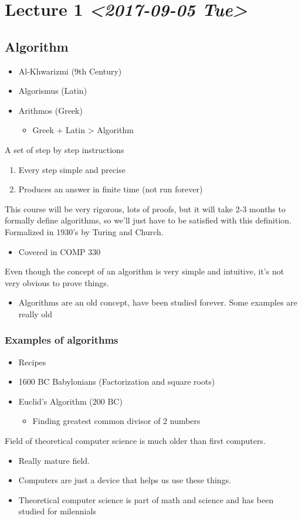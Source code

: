 \documentclass[11pt]{article}
\date{\today}
\title{}
\begin{document}
\tableofcontents

\section{Lecture 1 \textit{<2017-09-05 Tue>}}
\label{sec:org0096472}
\subsection{Algorithm}
\label{sec:orgdd4a82c}
\begin{itemize}
\item Al-Khwarizmi (9th Century)
\item Algorismus (Latin)
\item Arithmos (Greek)
\begin{itemize}
\item Greek + Latin > Algorithm
\end{itemize}
\end{itemize}
A set of step by step instructions
\begin{enumerate}
\item Every step simple and precise
\item Produces an answer in finite time (not run forever)
\end{enumerate}
This course will be very rigorous, lots of proofs, but it will take 2-3 months to formally define algorithms, so we'll just have to be satisfied with this definition.
Formalized in 1930's by Turing and Church.
\begin{itemize}
\item Covered in COMP 330
\end{itemize}
Even though the concept of an algorithm is very simple and intuitive, it's not very obvious to prove things.
\begin{itemize}
\item Algorithms are an old concept, have been studied forever. Some examples are really old
\end{itemize}
\subsubsection{Examples of algorithms}
\label{sec:orga940427}
\begin{itemize}
\item Recipes
\item 1600 BC Babylonians (Factorization and square roots)
\item Euclid's Algorithm (200 BC)
\begin{itemize}
\item Finding greatest common divisor of 2 numbers
\end{itemize}
\end{itemize}
Field of theoretical computer science is much older than first computers.
\begin{itemize}
\item Really mature field.
\item Computers are just a device that helps us use these things.
\item Theoretical computer science is part of math and science and has been studied for milennials
\end{itemize}
\end{document}
